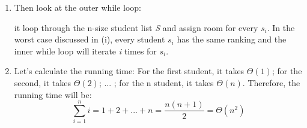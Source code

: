 \documentclass{homework}
\begin{document}
\begin{enumerate}
\begin{enumerate}
\begin{enumerate}
            \item Then look at the outer while loop:

            it loop through the n-size student list \textit{S} and assign room for every \textit{$s_i$}. In the worst case discussed in (i), every student \textit{$s_i$} has the same ranking and the inner while loop will iterate \textit{i} times for \textit{$s_i$}. 

            \item Let's calculate the running time:
            For the first student, it takes $\Theta(1)$; for the second, it takes $\Theta(2)$; ... ; for the n student, it takes $\Theta(n)$. Therefore, the running time will be:
            \[ \sum_{i=1}^{n} i = 1 + 2 + ... + n = \dfrac{n(n+1)}{2} = \Theta(n^2) \]
            
            
            
        \end{enumerate}
    \end{enumerate}
\end{enumerate}
\end{document}
